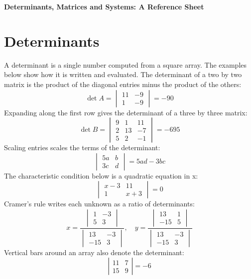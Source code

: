 \documentclass[11pt]{article}
\begin{document}
\begin{center}{\Large\bfseries Determinants, Matrices and Systems: A Reference Sheet}\end{center}
\section*{Determinants}
A determinant is a single number computed from a square array. The examples below show how it is written and evaluated.
The determinant of a two by two matrix is the product of the diagonal entries minus the product of the others:
\label{eq000}\[
  \det A = \begin{vmatrix} 11 & -9 \\ 1 & -9 \end{vmatrix} = -90
\]
Expanding along the first row gives the determinant of a three by three matrix:
\label{eq001}\[
  \det B = \begin{vmatrix} 9 & 1 & 11 \\ 2 & 13 & -7 \\ 5 & 2 & -1 \end{vmatrix} = -695
\]
Scaling entries scales the terms of the determinant:
\label{eq002}\[
  \begin{vmatrix} 5a & b \\ 3c & d \end{vmatrix} = 5ad - 3bc
\]
The characteristic condition below is a quadratic equation in x:
\label{eq003}\[
  \begin{vmatrix} x - 3 & 11 \\ 1 & x + 3 \end{vmatrix} = 0
\]
Cramer's rule writes each unknown as a ratio of determinants:
\label{eq004}\[
  x = \frac{\begin{vmatrix} 1 & -3 \\ 5 & 3 \end{vmatrix}}{\begin{vmatrix} 13 & -3 \\ -15 & 3 \end{vmatrix}}, \quad y = \frac{\begin{vmatrix} 13 & 1 \\ -15 & 5 \end{vmatrix}}{\begin{vmatrix} 13 & -3 \\ -15 & 3 \end{vmatrix}}
\]
Vertical bars around an array also denote the determinant:
\label{eq005}\[
  \left| \begin{array}{cc} 11 & 7 \\ 15 & 9 \end{array} \right| = -6
\]
\end{document}

